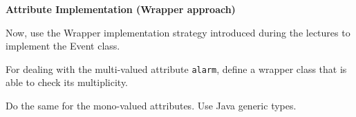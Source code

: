 \documentclass[a4paper,11pt]{memoir}
\newcommand{\code}[1]{\lstinline{#1}}
\begin{document}
	
\begin{question}
	\textbf{Attribute Implementation (Wrapper approach)}
	
Now, use the Wrapper implementation strategy introduced during the lectures to implement the Event class.
	\begin{inparaenum}
		\item For dealing with the multi-valued attribute \code{alarm}, define a wrapper class that is able to check its multiplicity.
		\item Do the same for the mono-valued attributes. Use Java generic types.
	\end{inparaenum}
\end{question}
\begin{solution}
	
	
	
	
\end{solution}
\end{document}

